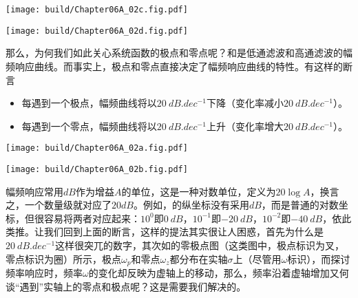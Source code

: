 \begin{Figure}[基本RC电路的系统函数可视化]
    \begin{FigureSub}[低通滤波的函数图]
        \texttt{[image: build/Chapter06A\_02c.fig.pdf]}
    \end{FigureSub}
    \hspace{1cm}
    \begin{FigureSub}[高通滤波的函数图]
        \texttt{[image: build/Chapter06A\_02d.fig.pdf]}
    \end{FigureSub}
\end{Figure}


那么，为何我们如此关心系统函数的极点和零点呢？和是低通滤波和高通滤波的幅频响应曲线。而事实上，极点和零点直接决定了幅频响应曲线的特性。有这样的断言
\begin{itemize}
    \item 每遇到一个极点，幅频曲线将以$\SI{20}{dB.dec^{-1}}$下降（变化率减小$\SI{20}{dB.dec^{-1}}$）。
    \item 每遇到一个零点，幅频曲线将以$\SI{20}{dB.dec^{-1}}$上升（变化率增大$\SI{20}{dB.dec^{-1}}$）。
\end{itemize}

\begin{Figure}[基本RC电路的幅频响应]
    \begin{FigureSub}[低通滤波的幅频响应]
        \texttt{[image: build/Chapter06A\_02a.fig.pdf]}
    \end{FigureSub}
    \begin{FigureSub}[高通滤波的幅频响应]
        \texttt{[image: build/Chapter06A\_02b.fig.pdf]}
    \end{FigureSub}
\end{Figure}

幅频响应常用$\si{dB}$作为增益$A$的单位，这是一种对数单位，定义为$20\log A$，换言之，一个数量级就对应了$20\si{dB}$。例如，的纵坐标没有采用$\si{dB}$，而是普通的对数坐标，但很容易将两者对应起来：$10^0$即$\SI{0}{dB}$，$10^{-1}$即$\SI{-20}{dB}$，$10^{-2}$即$\SI{-40}{dB}$，依此类推。让我们回到上面的断言，这样的提法其实很让人困惑，首先为什么是$\SI{20}{dB.dec^{-1}}$这样很突兀的数字，其次如的零极点图（这类图中，极点标识为叉，零点标识为圈）所示，极点$\omega_p$和零点$\omega_z$都分布在实轴$\sigma$上（尽管用$\omega$标识），而探讨频率响应时，频率$\omega$的变化却反映为虚轴上的移动，那么，频率沿着虚轴增加又何谈“遇到”实轴上的零点和极点呢？这是需要我们解决的。

